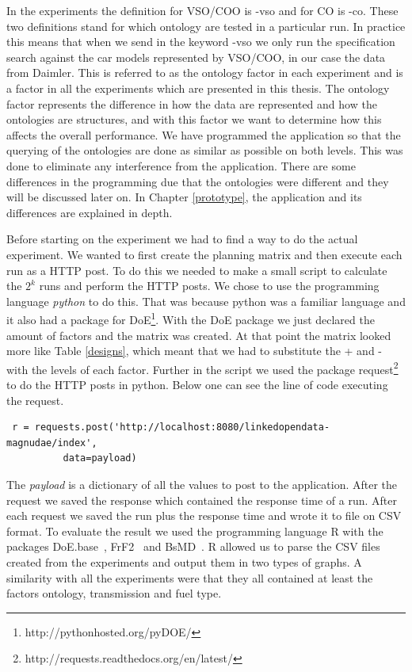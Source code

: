 \documentclass{llncs}
\begin{document}
In the experiments the definition for VSO/COO is \textsf{-vso} and for
CO is \textsf{-co}.  These two definitions stand for which ontology
are tested in a particular run. In practice this means that when we
send in the keyword \textsf{-vso} we only run the specification search
against the car models represented by VSO/COO, in our case the data
from Daimler. This is referred to as the ontology factor in each
experiment and is a factor in all the experiments which are presented
in this thesis. The ontology factor represents the difference in how
the data are represented and how the ontologies are structures, and
with this factor we want to determine how this affects the overall
performance.  We have programmed the application so that the querying
of the ontologies are done as similar as possible on both levels. This
was done to eliminate any interference from the application. There are
some differences in the programming due that the ontologies were
different and they will be discussed later on.  In Chapter
\ref{prototype}, the application and its differences are explained in
depth.

Before starting on the experiment we had to find a way to do the
actual experiment. We wanted to first create the planning matrix and
then execute each run as a HTTP post. To do this we needed to make a
small script to calculate the $2^k$ runs and perform the HTTP
posts. We chose to use the programming language \emph{python} to do
this. That was because python was a familiar language and it also had
a package for DoE\footnote{http://pythonhosted.org/pyDOE/}. With the
DoE package we just declared the amount of factors and the matrix was
created. At that point the matrix looked more like Table
\ref{designs}, which meant that we had to substitute the + and - with
the levels of each factor.  Further in the script we used the package
\textsf{request}\footnote{http://requests.readthedocs.org/en/latest/}
to do the HTTP posts in python. Below one can see the line of code
executing the request.

\scriptsize\begin{lstlisting}
 r = requests.post('http://localhost:8080/linkedopendata-magnudae/index', 
		  data=payload)
\end{lstlisting}
\normalsize

The \emph{payload} is a dictionary of all the values to post to the
application.  After the request we saved the response which contained
the response time of a run. After each request we saved the run plus
the response time and wrote it to file on CSV format. To evaluate the
result we used the programming language R with the packages
\textsf{DoE.base}~\cite{DoEBase}, \textsf{FrF2}~\cite{FrF2} and
\textsf{BsMD}~\cite{BsMD}. R allowed us to parse the CSV files created
from the experiments and output them in two types of graphs.  A
similarity with all the experiments were that they all contained at
least the factors ontology, transmission and fuel type.
\end{document}
